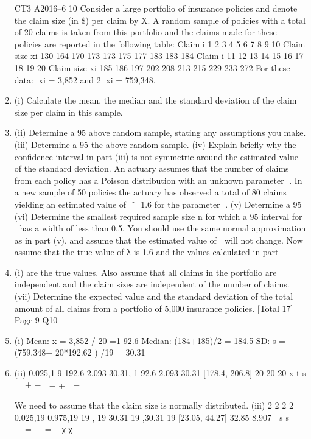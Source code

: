 \documentclass[a4paper,12pt]{article}
\begin{document}
\begin{enumerate}

CT3 A2016–6
10 Consider a large portfolio of insurance policies and denote the claim size (in \$) per
claim by X. A random sample of policies with a total of 20 claims is taken from this
portfolio and the claims made for these policies are reported in the following table:
  Claim i 1 2 3 4 5 6 7 8 9 10
Claim size xi 130 164 170 173 173 175 177 183 183 184
Claim i 11 12 13 14 15 16 17 18 19 20
Claim size xi 185 186 197 202 208 213 215 229 233 272
For these data: xi = 3,852 and 2
xi = 759,348.
\item (i) Calculate the mean, the median and the standard deviation of the claim size
per claim in this sample. 
\item (ii) Determine a 95%
above random sample, stating any assumptions you make. 
(iii) Determine a 95%
the above random sample. 
(iv) Explain briefly why the confidence interval in part (iii) is not symmetric
around the estimated value of the standard deviation. 
An actuary assumes that the number of claims from each policy has a Poisson
distribution with an unknown parameter . In a new sample of 50 policies the actuary
has observed a total of 80 claims yielding an estimated value of ˆ 1.6 for the
parameter .
(v) Determine a 95%
(vi) Determine the smallest required sample size n for which a 95%
interval for  has a width of less than 0.5. You should use the same normal
approximation as in part (v), and assume that the estimated value of  will not
change. 
Now assume that the true value of λ is 1.6 and the values calculated in part \item (i) are the
true values. Also assume that all claims in the portfolio are independent and the claim
sizes are independent of the number of claims.
(vii) Determine the expected value and the standard deviation of the total amount of
all claims from a portfolio of 5,000 insurance policies. 
[Total 17]
Page 9
Q10 \item (i) Mean: x = 3,852 / 20 =1 92.6 
Median: (184+185)/2 = 184.5 
SD: s = (759,348− 20*192.62 ) /19 = 30.31 
\item (ii) 0.025,1 9
192.6 2.093 30.31, 1 92.6 2.093 30.31 [178.4, 206.8]
20 20 20
x t s  
± =  − +  =
   

We need to assume that the claim size is normally distributed. 
(iii)
2 2
2 2
0.025,19 0.975,19
19 , 19 30.31 19 ,30.31 19 [23.05, 44.27]
32.85 8.907
 s s   
  =   =
   χ χ   


\end{enumerate}
\end{document}
